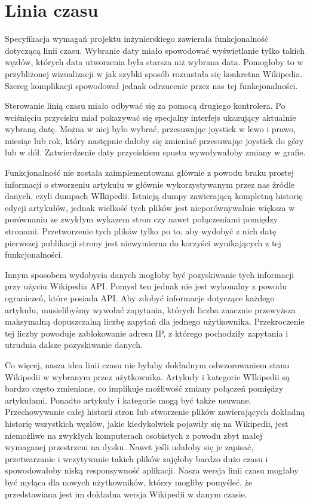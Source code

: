 \section{Linia czasu}
Specyfikacja wymagań projektu inżynierskiego zawierała funkcjonalność dotyczącą linii czasu. Wybranie daty miało spowodować wyświetlanie tylko takich węzłów, których data utworzenia była starsza niż wybrana data. Pomogłoby to w przybliżonej wizualizacji w jak szybki sposób rozrastała się konkretna Wikipedia. Szereg komplikacji spowodował jednak odrzucenie przez nas tej funkcjonalności.

Sterowanie linią czasu miało odbywać się za pomocą drugiego kontrolera. Po wciśnięciu przycisku miał pokazywać się specjalny interfejs ukazujący aktualnie wybraną datę. Można w niej było wybrać, przesuwając joystick w lewo i prawo, miesiąc lub rok, który następnie dałoby się zmieniać przesuwając joystick do góry lub w dół. Zatwierdzenie daty przyciskiem spustu wywoływałoby zmiany w grafie. 

Funkcjonalność nie została zaimplementowana głównie z powodu braku prostej informacji o stworzeniu artykułu w głównie wykorzystywanym przez nas źródle danych, czyli dumpach WIkipedii. Istnieją dumpy zawierającą kompletną historię edycji artykułów, jednak wielkość tych plików jest nieporównywalnie większa w porównaniu ze zwykłym wykazem stron czy nawet połączeniami pomiędzy stronami. Przetworzenie tych plików tylko po to, aby wydobyć z nich datę pierwszej publikacji strony jest niewymierna do korzyści wynikających z tej funkcjonalności. 

Innym sposobem wydobycia danych mogłoby być pozyskiwanie tych informacji przy użyciu Wikipedia API. Pomysł ten jednak nie jest wykonalny z powodu ograniczeń, które posiada API. Aby zdobyć informacje dotyczące każdego artykułu, musielibyśmy wywołać zapytania, których liczba znacznie przewyższa maksymalną dopuszczalną liczbę zapytań dla jednego użytkownika. Przekroczenie tej liczby powoduje zablokowanie adresu IP, z którego pochodziły zapytania i utrudnia dalsze pozyskiwanie danych.

Co więcej, nasza idea linii czasu nie byłaby dokładnym odwzorowaniem stanu Wikipedii w wybranym przez użytkownika. Artykuły i kategorie WIkipedii są bardzo często zmieniane, co implikuje możliwość zmiany połączeń pomiędzy artykułami. Ponadto artykuły i kategorie mogą być także usuwane. Przechowywanie całej historii stron lub stworzenie plików zawierających dokładną historię wszystkich węzłów, jakie kiedykolwiek pojawiły się na Wikipedii, jest niemożliwe na zwykłych komputerach osobistych z powodu zbyt małej wymaganej przestrzeni na dysku. Nawet jeśli udałoby się je zapisać, przetwarzanie i wczytywanie takich plików zajęłoby bardzo dużo czasu i spowodowałoby niską responsywność aplikacji. Nasza wersja linii czasu mogłaby być myląca dla nowych użytkowników, którzy mogliby pomyśleć, że przedstawiana jest im dokładna wersja Wikipedii w danym czasie.

